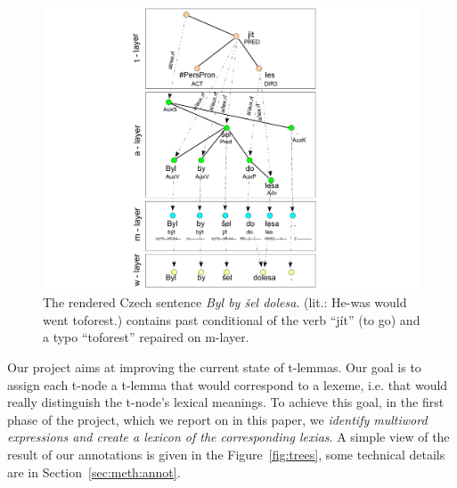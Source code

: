 \begin{figure}[htbp]
   \centering
   \includegraphics[scale=.38]{images/roviny.pdf} %
   \caption{The rendered Czech sentence {\em Byl by šel dolesa}. (lit.: He-was would went toforest.) contains past conditional of the verb ``jít'' (to go) and a typo ``toforest'' repaired on m-layer.}
   \label{fig:layers}
\end{figure}

Our project aims at improving the current state of t-lemmas. Our goal is to assign each t-node a t-lemma that would correspond to a lexeme, i.e. that would really distinguish the t-node's lexical meanings. To achieve this goal, in the first phase of the project, which we report on in this paper, we \textit{identify multiword expressions and create a lexicon of the corresponding lexias}. A simple view of the result of our annotations is given in the Figure~\ref{fig:trees}, some technical details are in Section~\ref{sec:meth:annot}.



